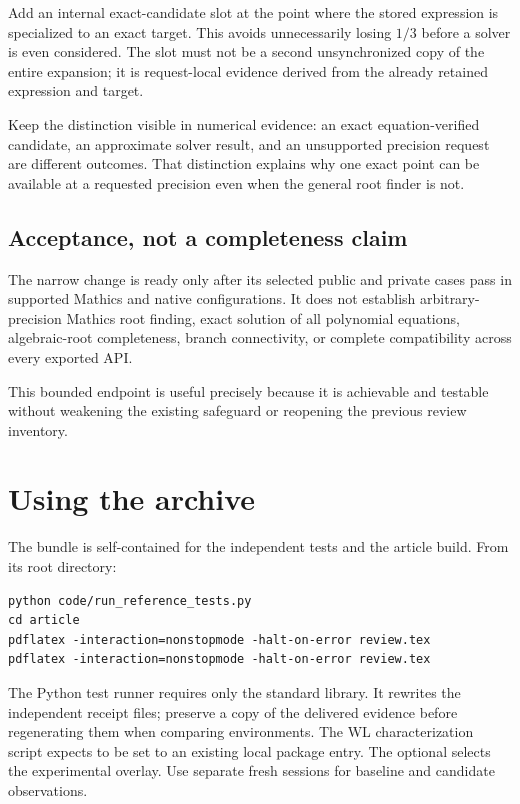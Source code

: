 \documentclass[11pt,letterpaper]{article}
\newcommand{\code}[1]{\texttt{\detokenize{#1}}}
\begin{document}
Add an internal exact-candidate slot at the point where the stored expression is specialized to an exact target. This avoids unnecessarily losing $1/3$ before a solver is even considered. The slot must not be a second unsynchronized copy of the entire expansion; it is request-local evidence derived from the already retained expression and target.

Keep the distinction visible in numerical evidence: an exact equation-verified candidate, an approximate solver result, and an unsupported precision request are different outcomes. That distinction explains why one exact point can be available at a requested precision even when the general root finder is not.

\subsection{Acceptance, not a completeness claim}

The narrow change is ready only after its selected public and private cases pass in supported Mathics and native configurations. It does not establish arbitrary-precision Mathics root finding, exact solution of all polynomial equations, algebraic-root completeness, branch connectivity, or complete compatibility across every exported API.

This bounded endpoint is useful precisely because it is achievable and testable without weakening the existing safeguard or reopening the previous review inventory.

\section{Using the archive}

The bundle is self-contained for the independent tests and the article build. From its root directory:
\begin{lstlisting}
python code/run_reference_tests.py
cd article
pdflatex -interaction=nonstopmode -halt-on-error review.tex
pdflatex -interaction=nonstopmode -halt-on-error review.tex
\end{lstlisting}

The Python test runner requires only the standard library. It rewrites the independent receipt files; preserve a copy of the delivered evidence before regenerating them when comparing environments. The WL characterization script expects \code{$AuditPackagePath} to be set to an existing local package entry. The optional \code{$AuditPatchPath} selects the experimental overlay. Use separate fresh sessions for baseline and candidate observations.
\end{document}
